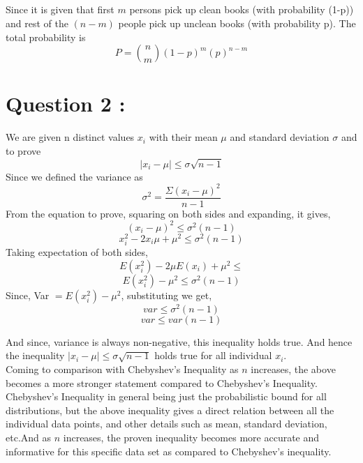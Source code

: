 \documentclass[11pt,a4paper,titlepage]{article}
\begin{document}
{\subsection{}{
Since it is given that first $m$ persons pick up clean books (with probability (1-p)) and rest of the $(n-m)$ people pick up unclean books (with probability p).
The total probability is 
$$P = \binom{n}{m}(1-p)^m(p)^{n-m}$$
}
\newpage







\section{Question 2 : }{
We are given n distinct values $x_i$ with their mean $\mu$ and standard deviation $\sigma$ and to prove 
$$|x_i-\mu| \leq \sigma \sqrt{n-1}$$
Since we defined the variance as 
$$\sigma^2 = \frac{\Sigma(x_i - \mu)^2}{n-1}$$
From the equation to prove, squaring on both sides and expanding, it gives,
$$(x_i - \mu)^2 \leq \sigma^2(n-1) $$
$$x_i^2 -2x_i\mu + \mu^2 \leq \sigma^2(n-1)$$
Taking expectation of both sides,
$$E(x_i^2) - 2\mu E(x_i) + \mu^2 \leq $$
$$E(x_i^2) - \mu^2 \leq \sigma^2(n-1)$$
Since, Var $ = E(x_i^2) - \mu^2$, substituting we get,
$${var} \leq \sigma^2(n-1)$$
$${var} \leq {var}(n-1)$$

And since, variance is always non-negative, this inequality holds true. And hence the inequality $|x_i-\mu| \leq \sigma \sqrt{n-1}$ holds true for all individual $x_i$. \\

Coming to comparison with Chebyshev's Inequality as $n$ increases, the above becomes a more stronger statement compared to Chebyshev's Inequality. Chebyshev's Inequality in general being just the probabilistic bound for all distributions, but the above inequality gives a direct relation between all the individual data points, and other details such as mean, standard deviation, etc.And as $n$ increases, the proven inequality becomes more accurate and informative for this specific data set as compared to Chebyshev's inequality.
}
\newpage






}
\end{document}
